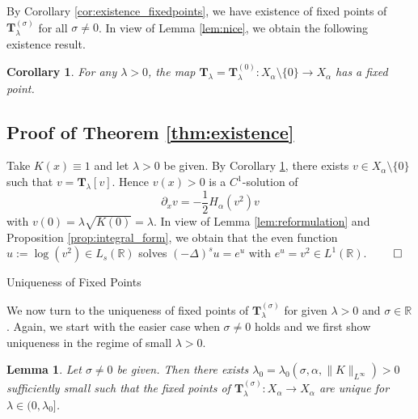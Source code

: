 \documentclass[reqno,10pt,a4paper]{amsart}
\makeatletter
\newtheorem{lem}{Lemma}[section]
\newtheorem{cor}{Corollary}[section]
\theoremstyle{definition}
\theoremstyle{definition}
\theoremstyle{remark}
\theoremstyle{remark}
\numberwithin{equation}{section}
\newcommand{\R}{\mathbb{R}}
\newcommand{\pt}{\partial}
\newcommand{\Ds}{(-\Delta)^{s}}
\newcommand{\Ts}{\mathbf{T}}
\newcommand{\Tss}{\mathbf{T}^{(\sigma)}_\lambda}
\def\section{\@startsection{section}{1}%
  \z@{1.5\linespacing\@plus\linespacing}{.5\linespacing}%
  {\normalfont\bfseries\large\centering}}
\makeatother
\begin{document}
By Corollary \ref{cor:existence_fixedpoints}, we have existence of fixed points of $\Tss$ for all $\sigma \neq 0$. In view of Lemma \ref{lem:nice}, we obtain the following existence result.

\begin{cor} \label{cor:exist}
For any $\lambda > 0$, the map $\Ts_{\lambda} = \Ts_{\lambda}^{(0)} : X_\alpha \setminus \{ 0 \} \to X_\alpha$ has a fixed point.
\end{cor} 

\subsection{Proof of Theorem \ref{thm:existence}} 
Take $K(x) \equiv 1$ and let $\lambda > 0$ be given. By Corollary \ref{cor:exist}, there exists $v \in X_\alpha \setminus \{ 0 \}$ such that $v = \mathbf{T}_{\lambda}[v]$. Hence $v(x) > 0$ is a $C^1$-solution of 
$$
\pt_x v = -\frac{1}{2} H_\alpha(v^2) v
$$
with $v(0) = \lambda \sqrt{K(0)} = \lambda$. In view of Lemma \ref{lem:reformulation} and Proposition \ref{prop:integral_form}, we obtain that the even function $u := \log(v^2) \in L_s(\R)$ solves $\Ds u = e^u$ with $e^u = v^2 \in L^1(\R)$. \hfill $\qed$

\section{Uniqueness of Fixed Points} \label{sec:unique}

We now turn to the uniqueness of fixed points of $\Tss$ for given $\lambda >0$ and $\sigma \in \R$. Again, we start with the easier case when $\sigma \neq 0$ holds and we first show uniqueness in the regime of small $\lambda >0$.

\begin{lem} \label{lem:unique_small}
Let $\sigma \neq 0$ be given. Then there exists $\lambda_0 = \lambda_0(\sigma, \alpha, \|K \|_{L^\infty}) > 0$ sufficiently small such that the fixed points of $\Tss : X_\alpha \to X_\alpha$ are unique for $\lambda \in (0, \lambda_0]$. 
\end{lem}
\end{document}

